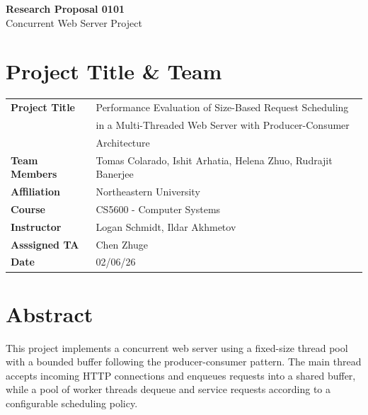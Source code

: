 \documentclass[11pt,a4paper]{article}
\begin{document}
\begin{center}
    {\LARGE \textbf{Research Proposal 0101}}\\[0.5cm]
    {\Large Concurrent Web Server Project}\\[1cm]
\end{center}

\section{Project Title \& Team}

\begin{table}[h!]
\centering
\begin{tabular}{@{}ll@{}}
\toprule
\textbf{Project Title} & Performance Evaluation of Size-Based Request Scheduling \\
                       & in a Multi-Threaded Web Server with Producer-Consumer \\
                       & Architecture \\[0.3cm]
\textbf{Team Members}   & Tomas Colarado, Ishit Arhatia, Helena Zhuo, Rudrajit Banerjee\\
\textbf{Affiliation}   & Northeastern University \\[0.3cm]
\textbf{Course}        & CS5600 - Computer Systems \\
\textbf{Instructor}    & Logan Schmidt, Ildar Akhmetov \\
\textbf{Asssigned TA}  & Chen Zhuge \\
\textbf{Date}          & 02/06/26 \\
\bottomrule
\end{tabular}
\end{table}

\section{Abstract}

This project implements a concurrent web server using a fixed-size thread pool with a bounded buffer following the producer-consumer pattern. The main thread accepts incoming HTTP connections and enqueues requests into a shared buffer, while a pool of worker threads dequeue and service requests according to a configurable scheduling policy. 
\end{document}

